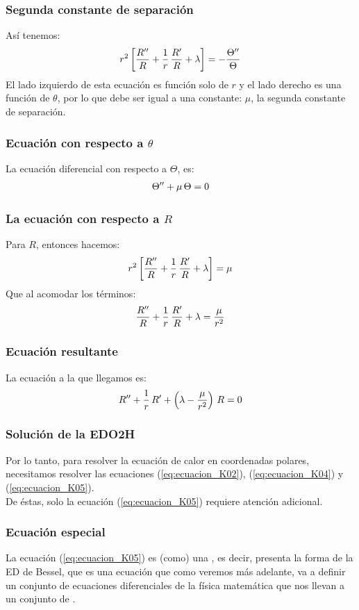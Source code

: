 \documentclass[12pt]{beamer}
\begin{document}
\begin{frame}
\frametitle{Segunda constante de separación}
Así tenemos:
\pause
\begin{align}
r^{2} \left[ \dfrac{{R}^{\prime \prime}}{R} + \dfrac{1}{r} \, \dfrac{{R}^{\prime}}{R} + \lambda \right] = - \dfrac{{\Theta}^{\prime \prime}}{\Theta}
\label{eq:ecuacion_K03}    
\end{align}
El lado izquierdo de esta ecuación es función solo de $r$ y el lado derecho es una función de $\theta$, por lo que debe ser igual a una constante: $\mu$, la segunda constante de separación.
\end{frame}
\begin{frame}
\frametitle{Ecuación con respecto a $\theta$}
La ecuación diferencial con respecto a $\Theta$, es:
\begin{align}
{\Theta}^{\prime \prime} + \mu \, \Theta = 0
\label{eq:ecuacion_K04}    
\end{align}
\end{frame}
\begin{frame}
\frametitle{La ecuación con respecto a $R$}
Para $R$, entonces hacemos:
\pause
\begin{align*}
r^{2} \left[ \dfrac{{R}^{\prime \prime}}{R} + \dfrac{1}{r} \, \dfrac{{R}^{\prime}}{R} + \lambda \right] = \mu
\end{align*}
\pause
Que al acomodar los términos:
\pause
\begin{align*}
\dfrac{{R}^{\prime \prime}}{R} + \dfrac{1}{r} \, \dfrac{{R}^{\prime}}{R} + \lambda = \dfrac{\mu}{r^{2}}
\end{align*}
\end{frame}
\begin{frame}
\frametitle{Ecuación resultante}
La ecuación a la que llegamos es:
\pause
\begin{align}
{R}^{\prime \prime} + \dfrac{1}{r} \, {R}^{\prime} + \left( \lambda - \dfrac{\mu}{r^{2}} \right) \, R = 0
\label{eq:ecuacion_K05}    
\end{align}
\end{frame}
\begin{frame}
\frametitle{Solución de la EDO2H}
Por lo tanto, para resolver la ecuación de calor en coordenadas polares, necesitamos resolver las ecuaciones (\ref{eq:ecuacion_K02}), (\ref{eq:ecuacion_K04}) y (\ref{eq:ecuacion_K05}).
\\
\bigskip
\pause
De éstas, solo la ecuación (\ref{eq:ecuacion_K05}) requiere atención adicional.
\end{frame}
\begin{frame}
\frametitle{Ecuación especial}
La ecuación (\ref{eq:ecuacion_K05}) es (como) una , es decir, presenta la forma de la ED de Bessel, que es una ecuación que como veremos más adelante, \pause va a definir un conjunto de ecuaciones diferenciales de la física matemática que nos llevan a un conjunto de .
\end{frame}
\end{document}
